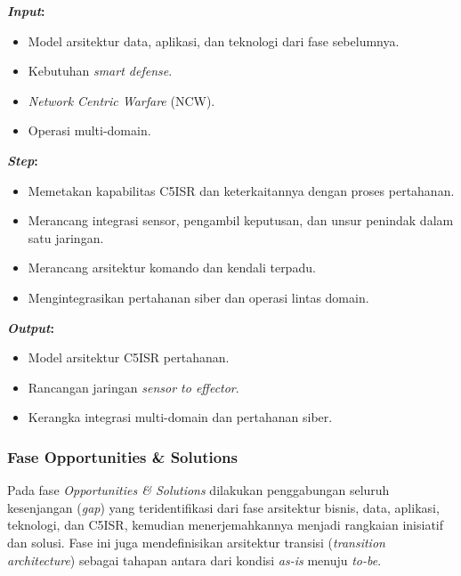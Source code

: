 \textbf{\textit{Input}:}
\begin{itemize}
  \item Model arsitektur data, aplikasi, dan teknologi dari fase sebelumnya.
  \item Kebutuhan \textit{smart defense}.
  \item \textit{Network Centric Warfare} (NCW).
  \item Operasi multi-domain.
\end{itemize}
\textbf{\textit{Step}:}
\begin{itemize}
  \item Memetakan kapabilitas C5ISR dan keterkaitannya dengan proses pertahanan.
  \item Merancang integrasi sensor, pengambil keputusan, dan unsur penindak dalam satu jaringan.
  \item Merancang arsitektur komando dan kendali terpadu.
  \item Mengintegrasikan pertahanan siber dan operasi lintas domain.
\end{itemize}
\textbf{\textit{Output}:}
\begin{itemize}
  \item Model arsitektur C5ISR pertahanan.
  \item Rancangan jaringan \textit{sensor to effector}.
  \item Kerangka integrasi multi-domain dan pertahanan siber.
\end{itemize}

\subsubsection{Fase Opportunities \& Solutions}
Pada fase \textit{Opportunities \& Solutions} dilakukan penggabungan seluruh kesenjangan (\textit{gap}) yang teridentifikasi dari fase arsitektur bisnis, data, aplikasi, teknologi, dan C5ISR, kemudian menerjemahkannya menjadi rangkaian inisiatif dan solusi.
Fase ini juga mendefinisikan arsitektur transisi (\textit{transition architecture}) sebagai tahapan antara dari kondisi \textit{as-is} menuju \textit{to-be}.

